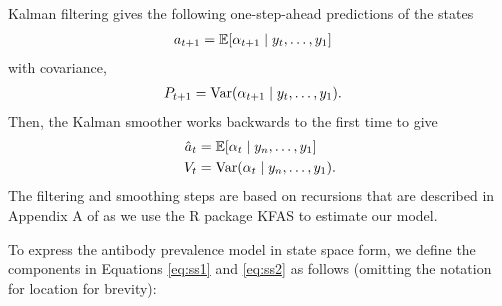 Kalman filtering gives the following one-step-ahead predictions of the states
\begin{align*}
a_{t+1} &= \mathbb{E}[\alpha_{t+1}\mid y_t, \dots, y_1] 
\end{align*} with covariance,
\begin{align*}
P_{t+1} &= \operatorname{Var}(\alpha_{t+1} \mid y_t, \dots, y_1).
\end{align*}
Then, the Kalman smoother works backwards to the first time to give
\begin{align}
\hat{a}_t &= \mathbb{E}[\alpha_{t}\mid y_n, \dots, y_1] \label{eq:hatat}\\
V_t &= \operatorname{Var}(\alpha_{t}\mid y_n, \dots, y_1). \label{eq:Vt}
\end{align}
The filtering and smoothing steps are based on recursions that are described in
Appendix A of \citep{helske2017kfas} as we use the R package KFAS to estimate
our model.


To express the antibody prevalence model in state space form, we define
 the components in Equations \ref{eq:ss1} and \ref{eq:ss2} as follows 
 (omitting the notation for location for brevity):


